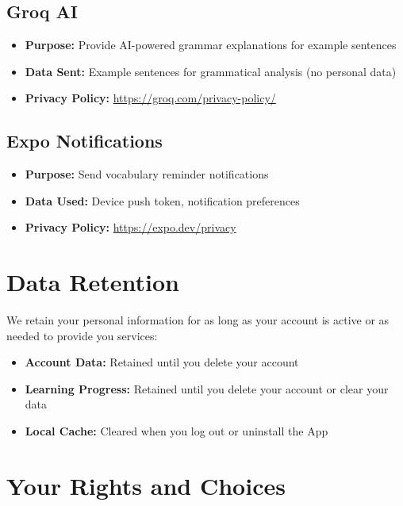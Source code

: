 \documentclass[11pt,a4paper]{article}
\begin{document}
\subsection{Groq AI}

\begin{itemize}[leftmargin=2em]
    \item \textbf{Purpose:} Provide AI-powered grammar explanations for example sentences
    \item \textbf{Data Sent:} Example sentences for grammatical analysis (no personal data)
    \item \textbf{Privacy Policy:} \url{https://groq.com/privacy-policy/}
\end{itemize}

\subsection{Expo Notifications}

\begin{itemize}[leftmargin=2em]
    \item \textbf{Purpose:} Send vocabulary reminder notifications
    \item \textbf{Data Used:} Device push token, notification preferences
    \item \textbf{Privacy Policy:} \url{https://expo.dev/privacy}
\end{itemize}

\section{Data Retention}

We retain your personal information for as long as your account is active or as needed to provide you services:

\begin{itemize}[leftmargin=2em]
    \item \textbf{Account Data:} Retained until you delete your account
    \item \textbf{Learning Progress:} Retained until you delete your account or clear your data
    \item \textbf{Local Cache:} Cleared when you log out or uninstall the App
\end{itemize}

\section{Your Rights and Choices}
\end{document}
